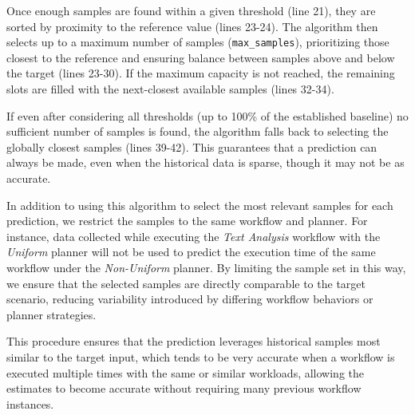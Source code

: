 Once enough samples are found within a given threshold (line 21), they are sorted by proximity to the reference value (lines 23-24). The algorithm then selects up to a maximum number of samples (\texttt{max\_samples}), prioritizing those closest to the reference and ensuring balance between samples above and below the target (lines 23-30). If the maximum capacity is not reached, the remaining slots are filled with the next-closest available samples (lines 32-34).

If even after considering all thresholds (up to 100\% of the established baseline) no sufficient number of samples is found, the algorithm falls back to selecting the globally closest samples (lines 39-42). This guarantees that a prediction can always be made, even when the historical data is sparse, though it may not be as accurate.

In addition to using this algorithm to select the most relevant samples for each prediction, we restrict the samples to the same workflow and planner. For instance, data collected while executing the \textit{Text Analysis} workflow with the \textit{Uniform} planner will not be used to predict the execution time of the same workflow under the \textit{Non-Uniform} planner. By limiting the sample set in this way, we ensure that the selected samples are directly comparable to the target scenario, reducing variability introduced by differing workflow behaviors or planner strategies.

This procedure ensures that the prediction leverages historical samples most similar to the target input, which tends to be very accurate when a workflow is executed multiple times with the same or similar workloads, allowing the estimates to become accurate without requiring many previous workflow instances.

